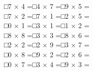 \documentclass[uplatex,
paper=a4,
fontsize=18pt,
jafontsize=16pt,
number_of_lines=30,
line_length=30zh,
baselineskip=25pt,
]{jlreq}
\begin{document}
□\hspace{1em}7 × 4 =\hspace{3em}□\hspace{1em}4 × 7 =\hspace{3em}□\hspace{1em}9 × 5 =\hspace{3em}
\\

□\hspace{1em}7 × 2 =\hspace{3em}□\hspace{1em}7 × 1 =\hspace{3em}□\hspace{1em}2 × 5 =\hspace{3em}
\\

□\hspace{1em}0 × 1 =\hspace{3em}□\hspace{1em}3 × 1 =\hspace{3em}□\hspace{1em}1 × 2 =\hspace{3em}
\\

□\hspace{1em}8 × 8 =\hspace{3em}□\hspace{1em}3 × 3 =\hspace{3em}□\hspace{1em}8 × 6 =\hspace{3em}
\\

□\hspace{1em}2 × 2 =\hspace{3em}□\hspace{1em}2 × 9 =\hspace{3em}□\hspace{1em}3 × 7 =\hspace{3em}
\\

□\hspace{1em}0 × 8 =\hspace{3em}□\hspace{1em}9 × 2 =\hspace{3em}□\hspace{1em}2 × 6 =\hspace{3em}
\\

□\hspace{1em}0 × 7 =\hspace{3em}□\hspace{1em}3 × 4 =\hspace{3em}□\hspace{1em}9 × 3 =\hspace{3em}
\\
\end{document}
